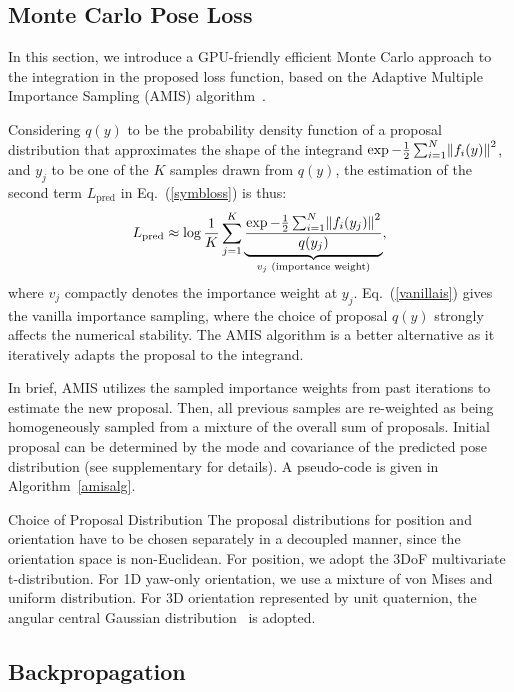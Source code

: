\documentclass[10pt,twocolumn,letterpaper]{article}
\makeatletter
\let\originalleft\left
\let\originalright\right
\renewcommand{\left}{\mathopen{}\mathclose\bgroup\originalleft}
\renewcommand{\right}{\aftergroup\egroup\originalright}
\renewcommand{\paragraph}{
  \@startsection{paragraph}{4}
  {\z@}{1.0ex \@plus 0ex \@minus .3ex}{-1em}
  {\normalfont\normalsize\bfseries}
}
\makeatother
\begin{document}
\subsection{Monte Carlo Pose Loss} \label{mcloss}

In this section, we introduce a GPU-friendly efficient Monte Carlo approach to the integration in the proposed loss function, based on the Adaptive Multiple Importance Sampling (AMIS) algorithm~\cite{amis}.


Considering $q(y)$ to be the probability density function of a proposal distribution that approximates the shape of the integrand $\exp -\frac{1}{2} \sum_{i=1}^N \left\| f_i(y) \right\|^2$, and $y_j$ to be one of the $K$ samples drawn from $q(y)$, the estimation of the second term $L_\text{pred}$ in Eq.~(\ref{symbloss}) is thus:
\begin{equation}
 L_\text{pred} \approx \log \frac{1}{K} \sum_{j=1}^K \underbrace{\frac{\exp - \frac{1}{2} \sum_{i=1}^N \left\| f_i(y_j)\right\|^2}{q(y_j)}}_{v_j \text{ (importance weight)}},
\label{vanillais}
\end{equation}
where $v_j$ compactly denotes the importance weight at $y_j$. Eq.~(\ref{vanillais}) gives the vanilla importance sampling, where the choice of proposal $q(y)$ strongly affects the numerical stability. The AMIS algorithm is a better alternative as it iteratively adapts the proposal to the integrand. 

In brief, AMIS utilizes the sampled importance weights from past iterations to estimate the new proposal. Then, all previous samples are re-weighted as being homogeneously sampled from a mixture of the overall sum of proposals. Initial proposal can be determined by the mode and covariance of the predicted pose distribution (see supplementary for details). A pseudo-code is given in Algorithm~\ref{amisalg}.


\paragraph{Choice of Proposal Distribution} 
The proposal distributions for position and orientation have to be chosen separately in a decoupled manner, since the orientation space is non-Euclidean. For position, we adopt the 3DoF multivariate t-distribution.
For 1D yaw-only orientation, we use a mixture of von Mises and uniform distribution. For 3D orientation represented by unit quaternion, the angular central Gaussian distribution~\cite{ACG} is adopted. 


\subsection{Backpropagation} \label{backprop}
\end{document}
